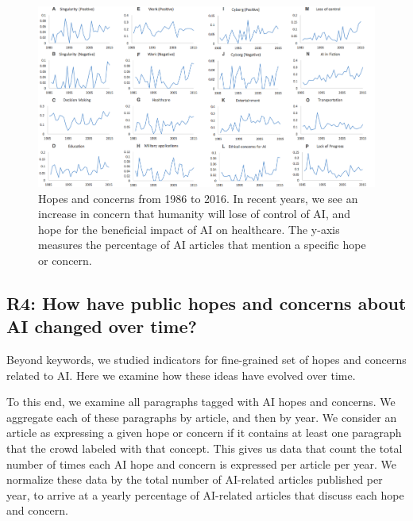 \documentclass[letterpaper]{article}
\begin{document}
\begin{figure}[!t]
\centering
\includegraphics[width=2.0\columnwidth]{ai-index}
\caption{Hopes and concerns from 1986 to 2016. In recent years, we see an increase in concern that humanity will lose of control of AI, and hope for the beneficial impact of AI on healthcare. The y-axis measures the percentage of AI articles that mention a specific hope or concern.}
\label{fig:index}
\end{figure}

\subsection{R4: How have public hopes and concerns about AI changed over time?}

Beyond keywords, we studied indicators for fine-grained set of hopes and concerns related to AI. Here we examine how these ideas have evolved over time.

To this end, we examine all paragraphs tagged with AI hopes and concerns. We aggregate each of these paragraphs by article, and then by year. We consider an article as expressing a given hope or concern if it contains at least one paragraph that the crowd labeled with that concept. This gives us data that count the total number of times each AI hope and concern is expressed per article per year. We normalize these data by the total number of AI-related articles published per year, to arrive at a yearly percentage of AI-related articles that discuss each hope and concern.
\end{document}

